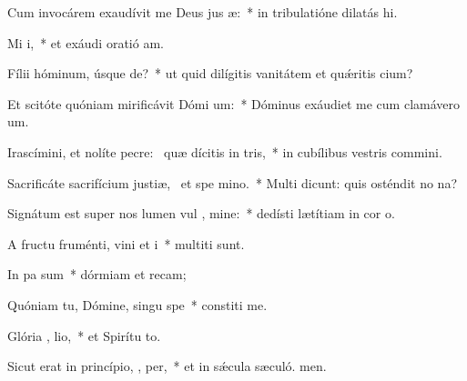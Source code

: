 \item Cum invocárem exaudívit me Deus jus æ:~* in tribulatióne dilatás hi.
\item Mi i,~* et exáudi oratió am.
\item Fílii hóminum, úsque  de?~* ut quid dilígitis vanitátem et quǽritis cium?
\item Et scitóte quóniam mirificávit Dómi  um:~* Dóminus exáudiet me cum clamávero  um.
\item Irascímini, et nolíte pecre:~\pscross{} quæ dícitis in  tris,~* in cubílibus vestris commini.
\item Sacrificáte sacrifícium justiæ,~\pscross{} et spe  mino.~* Multi dicunt: quis osténdit no na?
\item Signátum est super nos lumen vul , mine:~* dedísti lætítiam in cor o.
\item A fructu fruménti, vini et  i~* multiti sunt.
\item In pa  sum~* dórmiam et recam;
\item Quóniam tu, Dómine, singu  spe~* constiti me.
\item Glória ,  lio,~* et Spirítu to.
\item Sicut erat in princípio,  ,  per,~* et in sǽcula sæculó. men.
